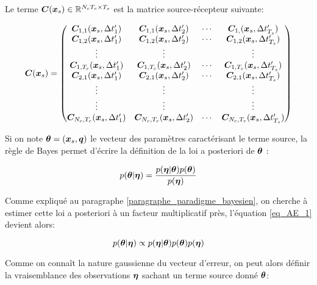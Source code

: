 Le terme ${\bm{C}}({\bm{x}_s}) \in \mathbb{R}^{N_cT_c \times T_s}$ est la matrice source-récepteur suivante:

\begin{equation}
{\bm{C}}({\bm{x}_s}) = 
\begin{pmatrix}
{\bm{C}}_{1,1}({\bm{x}_s}, \Delta t'_1) & {\bm{C}}_{1,1}({\bm{x}_s}, \Delta t'_2)  & \cdots & {\bm{C}}_{1,}({\bm{x}_s}, \Delta t'_{T_s}) \\ 
{\bm{C}}_{1,2}({\bm{x}_s}, \Delta t'_1) & {\bm{C}}_{1,2}({\bm{x}_s}, \Delta t'_2)  & \cdots & {\bm{C}}_{1,2}({\bm{x}_s}, \Delta t'_{T_s}) \\
\vdots & \vdots &  & \vdots \\
{\bm{C}}_{1,T_c}({\bm{x}_s}, \Delta t'_1) & {\bm{C}}_{1,T_c}({\bm{x}_s}, \Delta t'_2)  & \cdots & {\bm{C}}_{1,T_c}({\bm{x}_s}, \Delta t'_{T_s}) \\
{\bm{C}}_{2,1}({\bm{x}_s}, \Delta t'_1) & {\bm{C}}_{2,1}({\bm{x}_s}, \Delta t'_2)  & \cdots & {\bm{C}}_{2,1}({\bm{x}_s}, \Delta t'_{T_s}) \\
\vdots & \vdots &  & \vdots \\
\vdots & \vdots &  & \vdots \\
{\bm{C}}_{N_c,T_c}({\bm{x}_s}, \Delta t'_1) & {\bm{C}}_{N_c,T_c}({\bm{x}_s}, \Delta t'_2)  & \cdots & {\bm{C}}_{N_c,T_c}({\bm{x}_s}, \Delta t'_{T_s}) \\
\end{pmatrix}
\label{eq_AE_4}
\end{equation}

Si on note ${\bm{\theta}} = ({\bm{x}_s}, {\bm{q}})$ le vecteur des paramètres caractérisant le terme source, la règle de Bayes permet d'écrire la définition de la loi a posteriori de ${\bm{\theta}}$ : 

\begin{equation}
p({\bm{\theta}} | {\bm{\eta}}) = \dfrac{p({\bm{\eta}} | {\bm{\theta}})p({\bm{\theta}})}{p({\bm{\eta}})}
\label{eq_AE_1}
\end{equation}

Comme expliqué au paragraphe \ref{paragraphe_paradigme_bayesien}, on cherche à estimer cette loi a posteriori à un facteur multiplicatif près, l'équation \eqref{eq_AE_1} devient alors:

\begin{equation}
p({\bm{\theta}} | {\bm{\eta}}) \propto p({\bm{\eta}} | {\bm{\theta}})p({\bm{\theta}})p({\bm{\eta}})
\label{eq_AE_1_prop}
\end{equation}

Comme on connaît la nature gaussienne du vecteur d'erreur, on peut alors définir la vraisemblance des observations ${\bm{\eta}}$ sachant un terme source donné ${\bm{\theta}}$:

